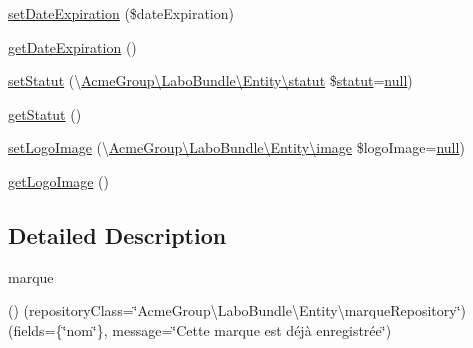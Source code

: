 \begin{DoxyCompactItemize}
\item 
\hyperlink{class_acme_group_1_1_labo_bundle_1_1_entity_1_1marque_a10c617c5a6a1eeaf9e9cf6c3c5a7e82c}{set\+Date\+Expiration} (\$date\+Expiration)
\item 
\hyperlink{class_acme_group_1_1_labo_bundle_1_1_entity_1_1marque_ad626faeb5bb69418f0f2873042304ab2}{get\+Date\+Expiration} ()
\item 
\hyperlink{class_acme_group_1_1_labo_bundle_1_1_entity_1_1marque_aafd7949903a1ebc7bb56ca7c101bcdeb}{set\+Statut} (\textbackslash{}\hyperlink{class_acme_group_1_1_labo_bundle_1_1_entity_1_1statut}{Acme\+Group\textbackslash{}\+Labo\+Bundle\textbackslash{}\+Entity\textbackslash{}statut} \$\hyperlink{class_acme_group_1_1_labo_bundle_1_1_entity_1_1statut}{statut}=\hyperlink{validate_8js_afb8e110345c45e74478894341ab6b28e}{null})
\item 
\hyperlink{class_acme_group_1_1_labo_bundle_1_1_entity_1_1marque_ac561462654847b1b8097ad5afe466f3f}{get\+Statut} ()
\item 
\hyperlink{class_acme_group_1_1_labo_bundle_1_1_entity_1_1marque_a63bfea6475c5c7c8691f166f5a0e7899}{set\+Logo\+Image} (\textbackslash{}\hyperlink{class_acme_group_1_1_labo_bundle_1_1_entity_1_1image}{Acme\+Group\textbackslash{}\+Labo\+Bundle\textbackslash{}\+Entity\textbackslash{}image} \$logo\+Image=\hyperlink{validate_8js_afb8e110345c45e74478894341ab6b28e}{null})
\item 
\hyperlink{class_acme_group_1_1_labo_bundle_1_1_entity_1_1marque_a1c3a3335a5dc97b7f9ec5fbbe0b65feb}{get\+Logo\+Image} ()
\end{DoxyCompactItemize}


\subsection{Detailed Description}
marque

() (repository\+Class=\char`\"{}\+Acme\+Group\textbackslash{}\+Labo\+Bundle\textbackslash{}\+Entity\textbackslash{}marque\+Repository\char`\"{}) (fields=\{\char`\"{}nom\char`\"{}\}, message=\char`\"{}\+Cette marque est déjà enregistrée\char`\"{}) 


